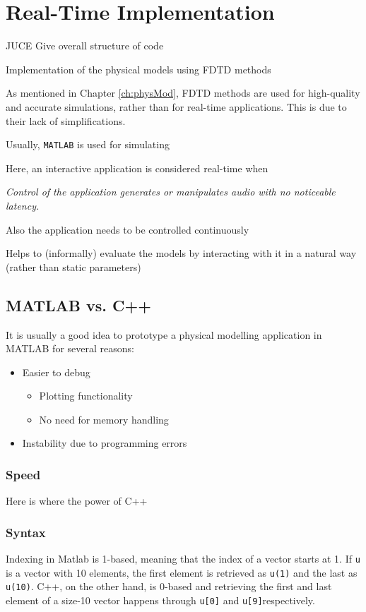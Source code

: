\chapter{Real-Time Implementation}
JUCE
Give overall structure of code


Implementation of the physical models
using FDTD methods

As mentioned in Chapter \ref{ch:physMod}, FDTD methods are used for high-quality and accurate simulations, rather than for real-time applications. This is due to their lack of simplifications.

Usually, \texttt{MATLAB} is used for simulating 

Here, an interactive application is considered real-time when
\begin{center}\it
    Control of the application generates or manipulates audio with no noticeable latency.
\end{center}

Also the application needs to be controlled continuously

Helps to (informally) evaluate the models by interacting with it in a natural way (rather than static parameters)

\section{MATLAB vs. C++}
It is usually a good idea to prototype a physical modelling application in MATLAB for several reasons:
\begin{itemize}
    \item Easier to debug
    \begin{itemize}
        \item Plotting functionality
        \item No need for memory handling
    \end{itemize}
    \item Instability due to programming errors 
\end{itemize}

\subsection{Speed}
Here is where the power of C++ 



\subsection{Syntax}
Indexing in
Matlab is 1-based, meaning that the index of a vector starts at 1. If \texttt{u} is a vector with 10 elements, the first element is retrieved as \texttt{u(1)} and the last as \texttt{u(10)}. C++, on the other hand, is 0-based and retrieving the first and last element of a size-10 vector happens through \texttt{u[0]} and \texttt{u[9]}respectively. 

